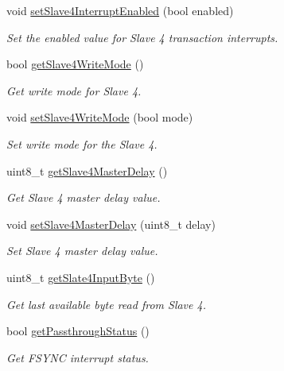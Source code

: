 \begin{DoxyCompactItemize}
void \mbox{\hyperlink{classMPU6050_a7d7498ebc26f8a1fe8c9dcf40cd5d265}{set\+Slave4\+Interrupt\+Enabled}} (bool enabled)
\begin{DoxyCompactList}\small\item\em Set the enabled value for Slave 4 transaction interrupts. \end{DoxyCompactList}\item 
bool \mbox{\hyperlink{classMPU6050_a8d5a5e73907c78960154b92656127372}{get\+Slave4\+Write\+Mode}} ()
\begin{DoxyCompactList}\small\item\em Get write mode for Slave 4. \end{DoxyCompactList}\item 
void \mbox{\hyperlink{classMPU6050_af1402fe7f3e1cc0dedb6714351cbca4e}{set\+Slave4\+Write\+Mode}} (bool mode)
\begin{DoxyCompactList}\small\item\em Set write mode for the Slave 4. \end{DoxyCompactList}\item 
uint8\+\_\+t \mbox{\hyperlink{classMPU6050_a9a4585b3c9e61478db198011107a56a9}{get\+Slave4\+Master\+Delay}} ()
\begin{DoxyCompactList}\small\item\em Get Slave 4 master delay value. \end{DoxyCompactList}\item 
void \mbox{\hyperlink{classMPU6050_ac154934a43c599cdc564fb29c22c45eb}{set\+Slave4\+Master\+Delay}} (uint8\+\_\+t delay)
\begin{DoxyCompactList}\small\item\em Set Slave 4 master delay value. \end{DoxyCompactList}\item 
uint8\+\_\+t \mbox{\hyperlink{classMPU6050_a9bc93f34bc3d85cbe6010b4a3a88c5a7}{get\+Slate4\+Input\+Byte}} ()
\begin{DoxyCompactList}\small\item\em Get last available byte read from Slave 4. \end{DoxyCompactList}\item 
bool \mbox{\hyperlink{classMPU6050_af2820067b73f177d985ed81e894281b0}{get\+Passthrough\+Status}} ()
\begin{DoxyCompactList}\small\item\em Get F\+S\+Y\+NC interrupt status. \end{DoxyCompactList}\item 

\end{DoxyCompactItemize}

